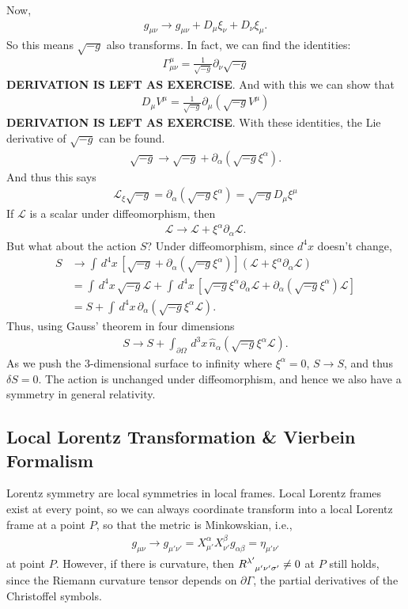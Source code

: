 \documentclass{book}
\numberwithin{equation}{section}
\theoremstyle{definition}
\newcommand{\p}{\partial}
\newcommand{\lag}{\mathcal{L}}
\newcommand{\f}[2]{\frac{#1}{#2}}
\newcommand{\lp}{\left(}
\newcommand{\rp}{\right)}
\newcommand{\lb}{\left[}
\newcommand{\rb}{\right]}
\begin{document}
Now, 
\begin{align}
g_{\mu\nu} \to g_{\mu\nu} + D_\mu\xi_\nu + D_\nu \xi_\mu.
\end{align}
So this means $\sqrt{-g}$ also transforms. In fact, we can find the identities:
\begin{align}
\boxed{\Gamma^\mu_{\mu\nu} = \f{1}{\sqrt{-g}}\p_\nu \sqrt{-g}}
\end{align}
\textbf{DERIVATION IS LEFT AS EXERCISE}. And with this we can show that
\begin{align}
\boxed{D_\mu V^\mu = \f{1}{\sqrt{-g}}\p_\mu \lp\sqrt{-g}V^\mu\rp}
\end{align}
\textbf{DERIVATION IS LEFT AS EXERCISE}. With these identities, the Lie derivative of $\sqrt{-g}$ can be found. 
\begin{align}
\sqrt{-g} \to \sqrt{-g} + \p_\alpha\lp \sqrt{-g}\xi^\alpha \rp.
\end{align}
And thus this says
\begin{align}
\boxed{\lag_\xi \sqrt{-g} = \p_\alpha\lp \sqrt{-g}\xi^\alpha \rp = \sqrt{-g}D_\mu\xi^\mu }
\end{align}
If $\lag$ is a scalar under diffeomorphism, then 
\begin{align}
\lag \to \lag + \xi^\alpha\p_\alpha\lag.
\end{align}
But what about the action $S$? Under diffeomorphism, since $d^4x$ doesn't change,
\begin{align}
S &\to \int\,d^4x\, \lb \sqrt{-g} + \p_\alpha \lp \sqrt{-g}\xi^\alpha \rp \rb (\lag + \xi^\alpha \p_\alpha \lag)\\
&= \int\,d^4x\,\sqrt{-g}\lag + \int\,d^4x\, \lb \sqrt{-g}\xi^\alpha \p_\alpha \lag + \p_\alpha \lp \sqrt{-g}\xi^\alpha \rp \lag \rb\\
&= S + \int\,d^4x\,\p_\alpha \lp \sqrt{-g}\xi^\alpha\lag \rp.
\end{align}
Thus, using Gauss' theorem in four dimensions
\begin{align}
S \to S + \int_{\p\Omega} \,d^3x\, \hat{n}_\alpha \lp \sqrt{-g}\xi^\alpha\lag \rp.
\end{align}
As we push the 3-dimensional surface to infinity where $\xi^\alpha = 0$, $S \to S$, and thus $\delta S = 0$. The action is unchanged under diffeomorphism, and hence we also have a symmetry in general relativity. 



\subsection{Local Lorentz Transformation \& Vierbein Formalism}
Lorentz symmetry are local symmetries in local  frames. Local Lorentz frames exist at every point, so we can always coordinate transform into a local Lorentz frame at a point $P$, so that the metric is Minkowskian, i.e., 
\begin{align}
g_{\mu\nu} \to g_{\mu'\nu'} = X^\alpha_{\mu'}X^\beta_{\nu'}g_{\alpha\beta} = \eta_{\mu'\nu'}
\end{align}
at point $P$. However, if there is curvature, then $\tensor{R}{^{\lambda'}_{\mu'\nu'\sigma'}} \neq 0$ at $P$ still holds, since the Riemann curvature tensor depends on $\p\Gamma$, the partial derivatives of the Christoffel symbols. 
\end{document}
